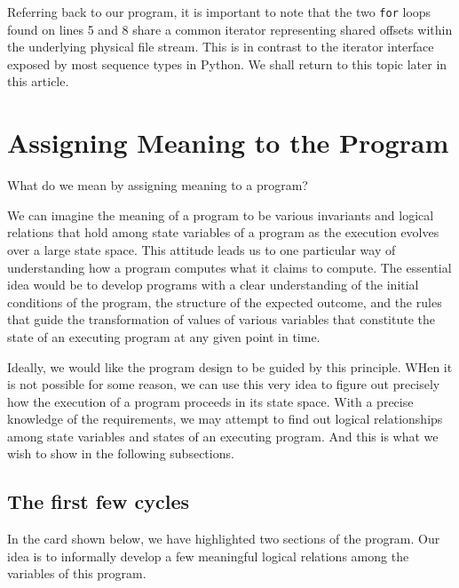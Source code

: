 \documentclass[10pt, a4paper]{article}
\begin{document}
Referring back to our program, it is important to note that the two \texttt{for} loops found on lines 5 and 8 share a common iterator representing shared offsets within the underlying physical file stream. This is in contrast to the iterator interface exposed by most sequence types in Python. We shall return to this topic later in this article.


\section{Assigning Meaning to the Program}
What do we mean by assigning meaning to a program?

We can imagine the meaning of a program to be various invariants and logical relations that hold among state variables of a program as the execution evolves over a large state space. This attitude leads us to one particular way of understanding how a program computes what it claims to compute. The essential idea would be to develop programs with a clear understanding of the initial conditions of the program, the structure of the expected outcome, and the rules that guide the transformation of values of various variables that constitute the state of an executing program at any given point in time.

Ideally, we would like the program design to be guided by this principle. WHen it is not possible for some reason, we can use this very idea to figure out precisely how the execution of a program proceeds in its state space. With a precise knowledge of the requirements, we may attempt to find out logical relationships among state variables and states of an executing program. And this is what we wish to show in the following subsections. 

\subsection{The first few cycles}
In the card shown below, we have highlighted two sections of the program. Our idea is to informally develop a few meaningful logical relations among the variables of this program.
\end{document}
